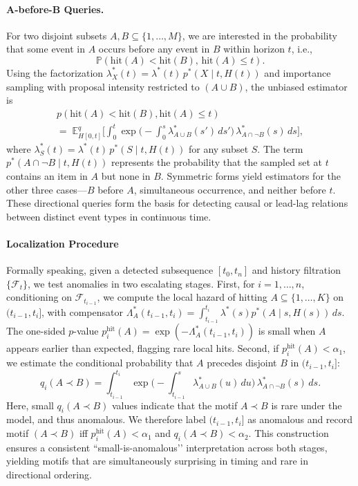\paragraph{A-before-B Queries.}
For two disjoint subsets $A,B \subseteq \{1,\dots,M\}$, we are interested in the probability that some event in $A$ occurs before any event in $B$ within horizon $t$, i.e.,
\[
\mathbb{P}(\text{hit}(A) < \text{hit}(B), \, \text{hit}(A) \leq t).
\]
Using the factorization $\lambda^{*}_X(t) = \lambda^{*}(t)\,p^{*}(X \mid t,H(t))$ and importance sampling with proposal intensity restricted to $(A \cup B)$, the unbiased estimator is
\begin{multline}
p(\text{hit}(A) < \text{hit}(B), \text{hit}(A) \le t) \\
= \; \mathbb{E}^{q}_{H[0,t]} \Bigg[
   \int_{0}^{t} 
   \exp\!\Bigg(-\int_{0}^{s} \lambda^{*}_{A\cup B}(s')\,ds'\Bigg)\,
   \lambda^{*}_{A \cap \neg B}(s)\, ds
\Bigg],
\end{multline}
where $\lambda^{*}_{S}(t) = \lambda^{*}(t)\,p^{*}(S \mid t,H(t))$ for any subset $S$. 
The term $p^{*}(A \cap \neg B \mid t,H(t))$ represents the probability that the sampled set at $t$ contains an item in $A$ but none in $B$. 
Symmetric forms yield estimators for the other three cases—$B$ before $A$, simultaneous occurrence, and neither before $t$. 
These directional queries form the basis for detecting causal or lead-lag relations between distinct event types in continuous time.





\paragraph{Localization Procedure}

Formally speaking, given a detected subsequence $[t_0,t_n]$ and history filtration $\{\mathcal{F}_t\}$, we test anomalies in two escalating stages. First, for $i=1,\dots,n$, conditioning on $\mathcal{F}_{t_{i-1}}$, we compute the local hazard of hitting $A\subseteq\{1,\ldots,K\}$ on $(t_{i-1},t_i]$, with compensator $\Lambda^*_A(t_{i-1},t_i)=\int_{t_{i-1}}^{t_i}\lambda^*(s)p^*(A\mid s,H(s))\,ds$. The one-sided $p$-value $p^{\text{hit}}_i(A)=\exp(-\Lambda^*_A(t_{i-1},t_i))$ is small when $A$ appears earlier than expected, flagging rare local hits. Second, if $p^{\text{hit}}_i(A)<\alpha_1$, we estimate the conditional probability that $A$ precedes disjoint $B$ in $(t_{i-1},t_i]$: 
\[
q_i(A\prec B)=\int_{t_{i-1}}^{t_i}\exp\!\Big(-\int_{t_{i-1}}^{s}\lambda^*_{A\cup B}(u)\,du\Big)\,\lambda^*_{A\cap \neg B}(s)\,ds.
\]
Here, small $q_i(A\prec B)$ values indicate that the motif $A\prec B$ is rare under the model, and thus anomalous. We therefore label $(t_{i-1},t_i]$ as anomalous and record motif $(A\prec B)$ iff $p^{\text{hit}}_i(A)<\alpha_1$ and $q_i(A\prec B)<\alpha_2$. This construction ensures a consistent “small-is-anomalous’’ interpretation across both stages, yielding motifs that are simultaneously surprising in timing and rare in directional ordering.

